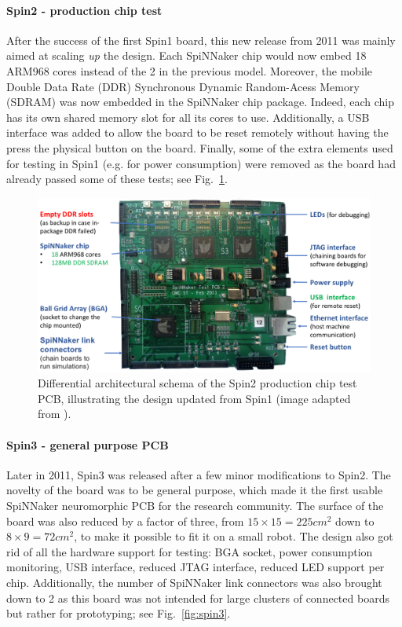 \paragraph{Spin2 - production chip test}
 
After the success of the first Spin1 board, this new release from 2011 was mainly aimed at scaling \textit{up} the design. Each SpiNNaker chip would now embed 18 ARM968 cores instead of the 2 in the previous model. Moreover, the mobile Double Data Rate (DDR) Synchronous Dynamic Random-Acess Memory (SDRAM) was now embedded in the SpiNNaker chip package. Indeed, each chip has its own shared memory slot for all its cores to use. Additionally, a USB interface was added to allow the board to be reset remotely without having the press the physical button on the board. Finally, some of the extra elements used for testing in Spin1 (e.g. for power consumption) were removed as the board had already passed some of these tests; see Fig.~\ref{fig:spin2}.


\begin{figure}[!ht]
\centering
\includegraphics[width=\textwidth]{figures/spin2-schema.png}
\caption{Differential architectural schema of the Spin2 production chip test PCB, illustrating the design updated from Spin1 (image adapted from \cite{dev-process}).}
\label{fig:spin2}
\end{figure} 

\newpage
\vspace*{-1.2cm}
\paragraph{Spin3 - general purpose PCB}

Later in 2011, Spin3 was released after a few minor modifications to Spin2. The novelty of the board was to be general purpose, which made it the first usable SpiNNaker neuromorphic PCB for the research community. The surface of the board was also reduced by a factor of three, from $15 \times 15 = 225cm^2$ down to $8 \times 9 = 72cm^2$, to make it possible to fit it on a small robot. The design also got rid of all the hardware support for testing: BGA socket, power consumption monitoring, USB interface, reduced JTAG interface, reduced LED support per chip. Additionally, the number of SpiNNaker link connectors was also brought down to 2 as this board was not intended for large clusters of connected boards but rather for prototyping; see Fig.~\ref{fig:spin3}.

